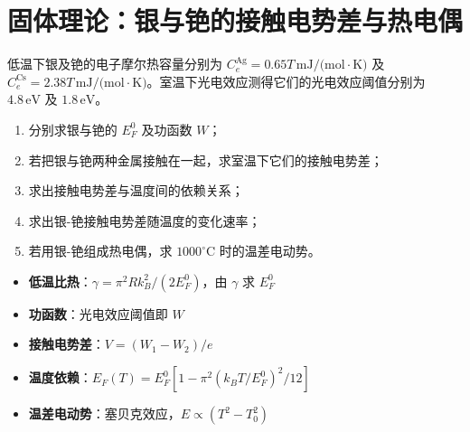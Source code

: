 \section{固体理论：银与铯的接触电势差与热电偶}
\label{sec:ag-cs-contact-potential}

\begin{modelbox}[题目：由低温比热与光电效应求接触电势差和温差电动势]
低温下银及铯的电子摩尔热容量分别为 $C_e^{\text{Ag}}=0.65T\,\text{mJ/(mol}\cdot\text{K)}$ 及 $C_e^{\text{Cs}}=2.38T\,\text{mJ/(mol}\cdot\text{K)}$。室温下光电效应测得它们的光电效应阈值分别为 $4.8\,\text{eV}$ 及 $1.8\,\text{eV}$。
\begin{enumerate}
    \item 分别求银与铯的 $E_F^0$ 及功函数 $W$；
    \item 若把银与铯两种金属接触在一起，求室温下它们的接触电势差；
    \item 求出接触电势差与温度间的依赖关系；
    \item 求出银-铯接触电势差随温度的变化速率；
    \item 若用银-铯组成热电偶，求 $1000^\circ\text{C}$ 时的温差电动势。
\end{enumerate}
\end{modelbox}

\begin{tipbox}[考点快速分析]
\begin{itemize}
    \item \textbf{低温比热}：$\gamma=\pi^2Rk_B^2/(2E_F^0)$，由 $\gamma$ 求 $E_F^0$
    \item \textbf{功函数}：光电效应阈值即 $W$
    \item \textbf{接触电势差}：$V=(W_1-W_2)/e$
    \item \textbf{温度依赖}：$E_F(T)=E_F^0[1-\pi^2(k_BT/E_F^0)^2/12]$
    \item \textbf{温差电动势}：塞贝克效应，$E\propto(T^2-T_0^2)$
\end{itemize}
\end{tipbox}

